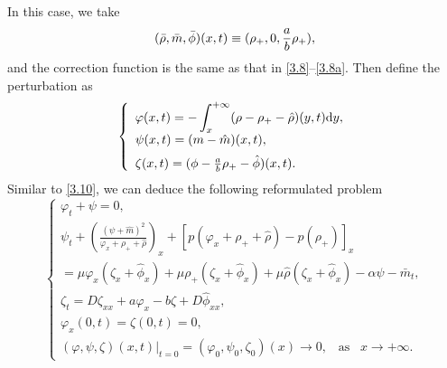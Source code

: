\documentclass[11pt]{article}
\theoremstyle{plain}
\numberwithin{equation}{section}
\begin{document}
In this case, we take
\begin{equation}\notag
(\bar{\rho},\bar{m}, \bar\phi)(x,t)\equiv (\rho_{+},0,\frac{a}{b}\rho_{+}),
\end{equation}
 and the correction function is the same as that in \eqref{3.8}--\eqref{3.8a}.
Then define the
	perturbation as
	\begin{equation}\notag
		\left\{
		\begin{array}{lr}
			\varphi(x,t)=-\displaystyle\int^{+\infty}_{x}(\rho-\rho_{+}-\hat\rho)(y,t){\rm d}y,\\[2mm]
			\psi(x,t)=(m-\hat m)(x,t),\\[2mm]
			\zeta(x,t)=(\phi-\frac{a}{b}\rho_{+}-\hat\phi)(x,t).
		\end{array}
		\right.
	\end{equation}
Similar to \eqref{3.10}, we can deduce the following reformulated problem 
	\begin{equation}\label{n3}
		\left\{
		\begin{array}{lr}
			\varphi_t+\psi=0,\\[2mm]
			\psi_t+\displaystyle\left(\frac{(\psi+\hat m)^2}{\varphi_x+\rho_{+}+\hat\rho}\right)_x+\left[p(\varphi_x+\rho_{+}+\hat\rho)-p(\rho_{+})\right]_x\\[2mm]
			=\mu \varphi_x(\zeta_x+\hat\phi_x)+\mu\rho_{+}(\zeta_x+\hat\phi_x)+\mu\hat\rho(\zeta_x+\hat\phi_x)-\alpha \psi-\bar m_t,\\[2mm]
			\zeta_t=D\zeta_{xx}+a\varphi_x-b\zeta+D\hat\phi_{xx},\\[2mm]
			\varphi_x(0,t)=\zeta(0,t)=0,\\[2mm]
			(\varphi,\psi,\zeta)(x,t)|_{t=0}=(\varphi_0,\psi_0,\zeta_0)(x)\to0,\;\;\;\mbox{as}\;\;\; x\to+\infty.
		\end{array}
		\right.
	\end{equation}
\end{document}
